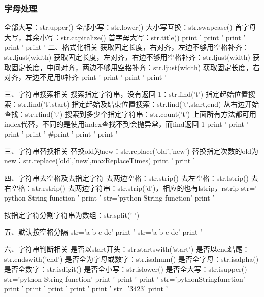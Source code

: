 \subsubsection{字母处理}
全部大写：str.upper()
全部小写：str.lower()
大小写互换：str.swapcase()
首字母大写，其余小写：str.capitalize()
首字母大写：str.title()
print '%
print '%
print '%
print '%
print '%
二、格式化相关
获取固定长度，右对齐，左边不够用空格补齐：str.ljust(width)
获取固定长度，左对齐，右边不够用空格补齐：str.ljust(width)
获取固定长度，中间对齐，两边不够用空格补齐：str.ljust(width)
获取固定长度，右对齐，左边不足用0补齐
print '%
print '%
print '%
print '%

三、字符串搜索相关
搜索指定字符串，没有返回-1：str.find('t')
指定起始位置搜索：str.find('t',start)
指定起始及结束位置搜索：str.find('t',start,end)
从右边开始查找：str.rfind('t')
搜索到多少个指定字符串：str.count('t')
上面所有方法都可用index代替，不同的是使用index查找不到会抛异常，而find返回-1
print '%
print '%
print '%
print '%
#print '%
print '%
print '%

三、字符串替换相关
替换old为new：str.replace('old','new')
替换指定次数的old为new：str.replace('old','new',maxReplaceTimes)
print '%
print '%

四、字符串去空格及去指定字符
去两边空格：str.strip()
去左空格：str.lstrip()
去右空格：str.rstrip()
去两边字符串：str.strip('d')，相应的也有lstrip，rstrip
str=' python String function '
print '%
str='python String function'
print '%

按指定字符分割字符串为数组：str.split(' ')

五、默认按空格分隔
str='a b c de'
print '%
str='a-b-c-de'
print '%

六、字符串判断相关
是否以start开头：str.startswith('start')
是否以end结尾：str.endswith('end')
是否全为字母或数字：str.isalnum()
是否全字母：str.isalpha()
是否全数字：str.isdigit()
是否全小写：str.islower()
是否全大写：str.isupper()
str='python String function'
print '%
print '%
print '%
str='pythonStringfunction'
print '%
print '%
print '%
print '%
print '%
str='3423'
print '%